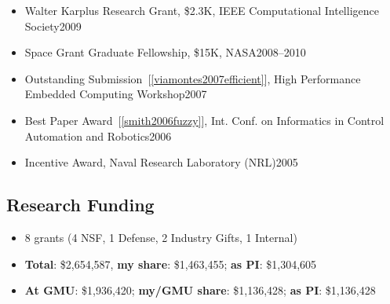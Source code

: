 \documentclass[11pt]{article}
\begin{document}
\begin{itemize}
      \item Walter Karplus Research Grant, \$2.3K, IEEE Computational Intelligence Society\hfill 2009
      \item Space Grant Graduate Fellowship, \$15K, NASA\hfill 2008--2010
      \item Outstanding Submission~[\ref{viamontes2007efficient}], High Performance Embedded Computing Workshop\hfill 2007
      \item  Best Paper Award~[\ref{smith2006fuzzy}],  Int. Conf. on Informatics in Control Automation and Robotics\hfill 2006
      \item Incentive Award,  Naval Research Laboratory (NRL)\hfill 2005
    \end{itemize}


    \subsection{Research Funding}
    \begin{itemize}[label={},before=\small]
      \item 8 grants (4 NSF, 1 Defense, 2 Industry Gifts, 1 Internal)

      \item \textbf{Total}: \$2,654,587, \textbf{my share}: \$1,463,455;  \textbf{as PI}: \$1,304,605
      \item \textbf{At GMU}: \$1,936,420; \textbf{my/GMU share}: \$1,136,428; \textbf{as PI}: \$1,136,428
    \end{itemize}
\end{document}
